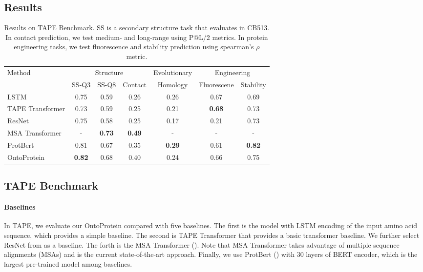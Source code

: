 \subsection{Results}
\begin{table}[]
\centering
\begin{tabular}{lcccccc}
\toprule
\multirow{2}{*}{Method} & \multicolumn{3}{c}{Structure} & Evolutionary & \multicolumn{2}{c}{Engineering} \\ 
                        & SS-Q3   & SS-Q8   & Contact   & Homology     & Fluorescene     & Stability     \\ \midrule
LSTM            & 0.75 & 0.59 & 0.26 & 0.26 & 0.67 &  0.69 \\
TAPE Transformer & 0.73 & 0.59 & 0.25 & 0.21 & {\textbf{0.68}} &  0.73 \\
ResNet          & 0.75 & 0.58 & 0.25 & 0.17 &  0.21 &  0.73 \\
MSA Transformer & - & \textbf{0.73} & \textbf{0.49} & - & - & - \\
ProtBert        & 0.81 & 0.67 & 0.35 & {\color{highlight} \textbf{0.29}} & 0.61 & {\color{highlight} \textbf{0.82}} \\
OntoProtein     & \textbf{0.82} & 0.68 & 0.40 & 0.24 & 0.66 & 0.75 \\
\bottomrule
\end{tabular}
\caption{
Results on TAPE Benchmark. 
SS is a secondary structure task that evaluates in CB513.
In contact prediction, we test medium- and long-range using P@L/2 metrics.
In protein engineering tasks, we test fluorescence and stability prediction using spearman's $\rho$ metric.%
}
\label{tape}
\end{table}

\subsection*{TAPE Benchmark}
\paragraph{Baselines}
In TAPE, we evaluate our OntoProtein compared with five baselines. 
The first is the model with LSTM encoding of the input amino acid sequence, which provides a simple baseline. 
The second is TAPE Transformer that provides a basic transformer baseline.
We further select  ResNet from \cite{DBLP:conf/cvpr/HeZRS16} as a baseline.
The forth is the MSA Transformer (\cite{DBLP:conf/icml/RaoLVMCASR21}).
Note that MSA Transformer takes advantage of multiple sequence alignments (MSAs) and is the current state-of-the-art approach.
Finally, we use ProtBert (\cite{DBLP:journals/corr/abs-2007-06225}) with 30 layers of BERT encoder, which is the largest pre-trained model among baselines.

